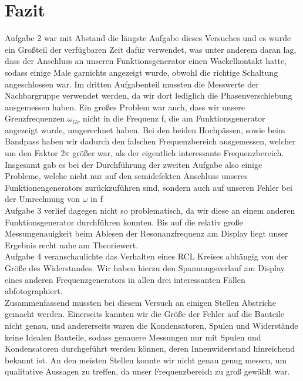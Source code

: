 \documentclass[12pt]{scrartcl}
\begin{document}
\section{Fazit}
Aufgabe 2 war mit Abstand die längste Aufgabe dieses Versuches und es wurde ein Großteil der verfügbaren Zeit dafür verwendet, was unter anderem daran lag, dass der Anschluss an unseren Funktionsgenerator einen Wackelkontakt hatte, sodass einige Male garnichts angezeigt wurde, obwohl die richtige Schaltung angeschlossen war. Im dritten Aufgabenteil mussten die Messwerte der Nachbargruppe verwendet werden, da wir dort lediglich die Phasenverschiebung ausgemessen haben. Ein großes Problem war auch, dass wir unsere Grenzfrequenzen $\omega_{Gr}$ nicht in die Frequenz f, die am Funktionsgenerator angezeigt wurde, umgerechnet haben. Bei den beiden Hochpässen, sowie beim Bandpass haben wir dadurch den falschen Frequenzbereich ausgemessen, welcher um den Faktor 2$\pi$ größer war, als der eigentlich interessante Frequenzbereich. Insgesamt gab es bei der Durchführung der zweiten Aufgabe also einige Probleme, welche nicht nur auf den semidefekten Anschluss unseres Funktionengenerators zurückzuführen sind, sondern auch auf unseren Fehler bei der Umrechnung von $\omega$ in f\\
Aufgabe 3 verlief dagegen nicht so problematisch, da wir diese an einem anderen Funktionsgenerator durchführen konnten. Bis auf die relativ große Messungenauigkeit beim Ablesen der Resonanzfrequenz am Display liegt unser Ergebnis recht nahe am Theoriewert.\\
Aufgabe 4 veranschaulichte das Verhalten eines RCL Kreises abhängig von der Größe des Widerstandes. Wir haben hierzu den Spannungsverlauf am Display eines anderen Frequenzgenerators in allen drei interessanten Fällen abfotographiert.\\
Zusammenfassend mussten bei diesem Versuch an einigen Stellen Abstriche gemacht werden. Einerseits kannten wir die Größe der Fehler auf die Bauteile nicht genau, und andererseits waren die Kondensatoren, Spulen und Widerstände keine Idealen Bauteile, sodass genauere Messungen nur mit Spulen und Kondensatoren durchgeführt werden können, deren Innenwiderstand hinreichend bekannt ist. An den meisten Stellen konnte wir nicht genau genug messen, um qualitative Aussagen zu treffen, da unser Frequenzbereich zu groß gewählt war.
\end{document}
